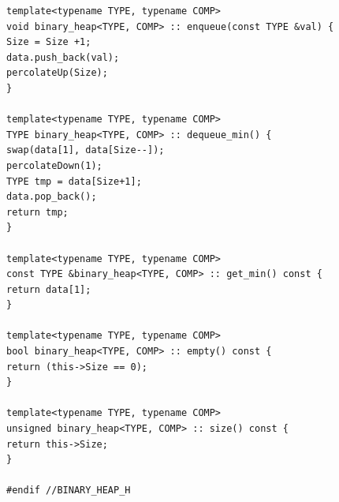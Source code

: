 \documentclass[12pt,a4paper]{article}
\theoremstyle{definition}
\begin{document}
\begin{lstlisting}[caption={binary\_heap.h}]
template<typename TYPE, typename COMP>
void binary_heap<TYPE, COMP> :: enqueue(const TYPE &val) {
Size = Size +1;
data.push_back(val);
percolateUp(Size);
}

template<typename TYPE, typename COMP>
TYPE binary_heap<TYPE, COMP> :: dequeue_min() {
swap(data[1], data[Size--]);
percolateDown(1);
TYPE tmp = data[Size+1];
data.pop_back();
return tmp;
}

template<typename TYPE, typename COMP>
const TYPE &binary_heap<TYPE, COMP> :: get_min() const {
return data[1];
}

template<typename TYPE, typename COMP>
bool binary_heap<TYPE, COMP> :: empty() const {
return (this->Size == 0);
}

template<typename TYPE, typename COMP>
unsigned binary_heap<TYPE, COMP> :: size() const {
return this->Size;
}

#endif //BINARY_HEAP_H
 \end{lstlisting}
 
\end{document}
